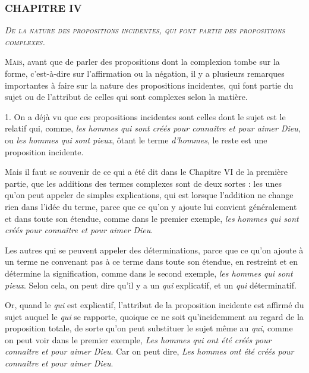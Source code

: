 \subsubsection{\centering \Large CHAPITRE IV}
\begin{center}\emph{\large\scshape De la nature des propositions incidentes, qui font partie des propositions complexes.}\end{center}

	\lettrine{M}{ais}, avant que de parler des propositions dont la complexion tombe sur la forme, c'est-à-dire sur l'affirmation ou la négation, il y a plusieurs remarques importantes à faire sur la nature des propositions incidentes, qui font partie du sujet ou de l'attribut de celles qui sont complexes selon la matière.

\bigbreak
{1.} On a déjà vu que ces propositions incidentes sont celles dont le sujet est le relatif qui, comme, \emph{les hommes qui sont créés pour connaître et pour aimer Dieu}, ou \emph{les hommes qui sont pieux}, ôtant le terme \emph{d'hommes}, le reste est une proposition incidente.

Mais il faut se souvenir de ce qui a été dit dans le Chapitre VI de la première partie, que les additions des termes complexes sont de deux sortes : les unes qu'on peut appeler de simples explications, qui est lorsque l'addition ne change rien dans l'idée du terme, parce que ce qu'on y ajoute lui convient généralement et dans toute son étendue, comme dans le premier exemple, \emph{les hommes qui sont créés pour connaître et pour aimer Dieu}.

Les autres qui se peuvent appeler des déterminations, parce que ce qu'on ajoute à un terme ne convenant pas à ce terme dans toute son étendue, en restreint et en détermine la signification, comme dans le second exemple, \emph{les hommes qui sont pieux}. Selon cela, on peut dire qu'il y a un \emph{qui} explicatif, et un \emph{qui} déterminatif.

Or, quand le \emph{qui} est explicatif, l'attribut de la proposition incidente est affirmé du sujet auquel le \emph{qui} se rapporte, quoique ce ne soit qu'incidemment au regard de la proposition totale, de sorte qu'on peut substituer le sujet même au \emph{qui}, comme on peut voir dans le premier exemple, \emph{Les hommes qui ont été créés pour connaître et pour aimer Dieu}. Car on peut dire, \emph{Les hommes ont été créés pour connaître et pour aimer Dieu}.

